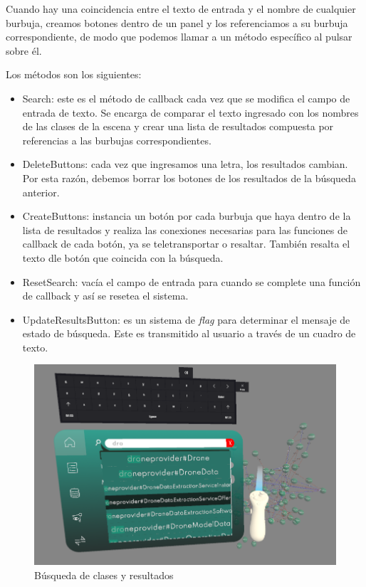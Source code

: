 Cuando hay una coincidencia entre el texto de entrada y el nombre de cualquier burbuja, creamos botones dentro de un panel y los referenciamos a su burbuja correspondiente, de modo que podemos llamar a un método específico al pulsar sobre él.

Los métodos son los siguientes:
\begin{itemize}
   \item Search: este es el método de callback cada vez que se modifica el campo de entrada de texto. Se encarga de comparar el texto ingresado con los nombres de las clases de la escena y crear una lista de resultados compuesta por referencias a las burbujas correspondientes.
   \item DeleteButtons: cada vez que ingresamos una letra, los resultados cambian. Por esta razón, debemos borrar los botones de los resultados de la búsqueda anterior.
   \item CreateButtons: instancia un botón por cada burbuja que haya dentro de la lista de resultados y realiza las conexiones necesarias para las funciones de callback de cada botón, ya se teletransportar o resaltar. También resalta el texto dle botón que coincida con la búsqueda.
   \item ResetSearch: vacía el campo de entrada para cuando se complete una función de callback y así se resetea el sistema.
   \item UpdateResultsButton: es un sistema de \textit{flag} para determinar el mensaje de estado de búsqueda. Este es transmitido al usuario a través de un cuadro de texto.
\end{itemize}

\begin{figure}[ht]
   \begin{center}
      \includegraphics[width=0.7\linewidth]{chapter2/figures/searchtool.png}
   \end{center}
   \caption[Búsqueda de clases y resultados]
   {\footnotesize Búsqueda de clases y resultados}
   \label{fig:mufigure10}
\end{figure}

